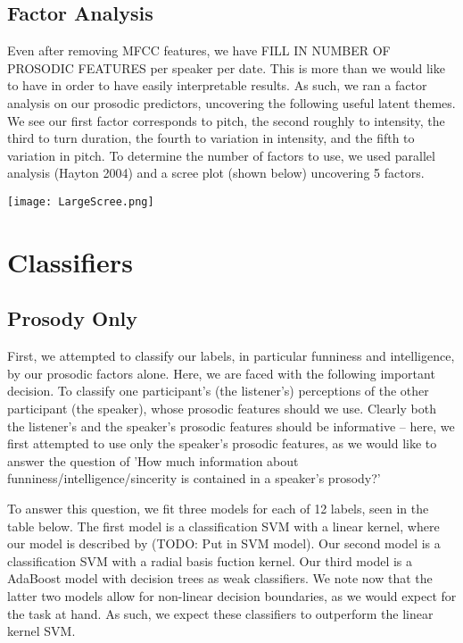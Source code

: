 \documentclass[11pt]{article}
\begin{document}
\subsection{Factor Analysis}
Even after removing MFCC features, we have FILL IN NUMBER OF PROSODIC FEATURES per speaker per date.  This is more than we would like to have in order to have easily interpretable results.  As such, we ran a factor analysis on our prosodic predictors, uncovering the following useful latent themes.  We see our first factor corresponds to pitch, the second roughly to intensity, the third to turn duration, the fourth to variation in intensity, and the fifth to variation in pitch. To determine the number of factors to use, we used parallel analysis (Hayton 2004) and a scree plot (shown below) uncovering 5 factors.

\begin{center}
\texttt{[image: LargeScree.png]}
\end{center}

\section{Classifiers}
\subsection{Prosody Only}
First, we attempted to classify our labels, in particular funniness and intelligence, by our prosodic factors alone.  Here, we are faced with the following important decision.  To classify one participant's (the listener's) perceptions of the other participant (the speaker), whose prosodic features should we use.  Clearly both the listener's and the speaker's prosodic features should be informative -- here, we first attempted to use only the speaker's prosodic features, as we would like to answer the question of 'How much information about funniness/intelligence/sincerity is contained in a speaker's prosody?'

To answer this question, we fit three models for each of 12 labels, seen in the table below.  The first model is a classification SVM with a linear kernel, where our model is described by (TODO: Put in SVM model).  Our second model is a classification SVM with a radial basis fuction kernel.  Our third model is a AdaBoost model with decision trees as weak classifiers.  We note now that the latter two models allow for non-linear decision boundaries, as we would expect for the task at hand.  As such, we expect these classifiers to outperform the linear kernel SVM. 
\end{document}
